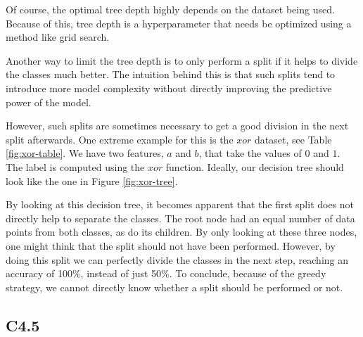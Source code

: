 \documentclass[a4paper]{article}
\begin{document}
Of course, the optimal tree depth highly depends on the dataset being used. Because of this, tree depth is a hyperparameter that needs be optimized using a method like grid search.

Another way to limit the tree depth is to only perform a split if it helps to divide the classes much better. The intuition behind this is that such splits tend to introduce more model complexity without directly improving the predictive power of the model.

However, such splits are sometimes necessary to get a good division in the next split afterwards. One extreme example for this is the $\mathit{xor}$ dataset, see Table \ref{fig:xor-table}. We have two features, $a$ and $b$, that take the values of $0$ and $1$. The label is computed using the $\mathit{xor}$ function. Ideally, our decision tree should look like the one in Figure \ref{fig:xor-tree}.

By looking at this decision tree, it becomes apparent that the first split does not directly help to separate the classes. The root node had an equal number of data points from both classes, as do its children. By only looking at these three nodes, one might think that the split should not have been performed. However, by doing this split we can perfectly divide the classes in the next step, reaching an accuracy of 100\%, instead of just 50\%. To conclude, because of the greedy strategy, we cannot directly know whether a split should be performed or not.

\begin{figure}
\begin{floatrow}
\end{floatrow}
\end{figure}

\subsection{C4.5}
\label{subsec:c45}
\end{document}
